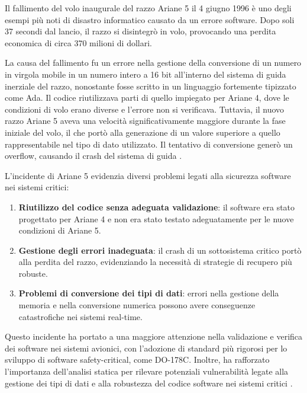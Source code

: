 Il fallimento del volo inaugurale del razzo Ariane 5 il 4 giugno 1996 è uno degli esempi più noti di disastro informatico causato da un errore software. Dopo soli 37 secondi dal lancio, il razzo si disintegrò in volo, provocando una perdita economica di circa 370 milioni di dollari.

La causa del fallimento fu un errore nella gestione della conversione di un numero in virgola mobile in un numero intero a 16 bit all'interno del sistema di guida inerziale del razzo, nonostante fosse scritto in un linguaggio fortemente tipizzato come Ada.
Il codice riutilizzava parti di quello impiegato per Ariane 4, dove le condizioni di volo erano diverse e l'errore non si verificava. Tuttavia, il nuovo razzo Ariane 5 aveva una velocità significativamente maggiore durante la fase iniziale del volo, il che portò alla generazione di un valore superiore a quello rappresentabile nel tipo di dato utilizzato. Il tentativo di conversione generò un overflow, causando il crash del sistema di guida \cite{Lions1996}.

L'incidente di Ariane 5 evidenzia diversi problemi legati alla sicurezza software nei sistemi critici:
\begin{enumerate}
    \item \textbf{Riutilizzo del codice senza adeguata validazione}: il software era stato progettato per Ariane 4 e non era stato testato adeguatamente per le nuove condizioni di Ariane 5.
    \item \textbf{Gestione degli errori inadeguata}: il crash di un sottosistema critico portò alla perdita del razzo, evidenziando la necessità di strategie di recupero più robuste.
    \item \textbf{Problemi di conversione dei tipi di dati}: errori nella gestione della memoria e nella conversione numerica possono avere conseguenze catastrofiche nei sistemi real-time.
\end{enumerate}

Questo incidente ha portato a una maggiore attenzione nella validazione e verifica dei software nei sistemi avionici, con l'adozione di standard più rigorosi per lo sviluppo di software safety-critical, come DO-178C. Inoltre, ha rafforzato l'importanza dell'analisi statica per rilevare potenziali vulnerabilità legate alla gestione dei tipi di dati e alla robustezza del codice software nei sistemi critici \cite{RTCA2011}.